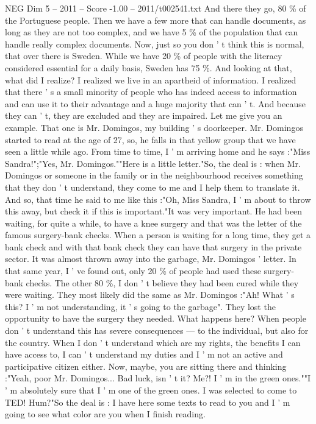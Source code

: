 \begin{textsample}{NEG Dim 5 – 2011 – Score -1.00 – 2011/t002541.txt}
And there they go, 80 \% of the Portuguese people.
Then we have a few more that can handle documents, as long as they are not too complex, and we have 5 \% of the population that can handle really complex documents.
Now, just so you don ' t think this is normal, that over there is Sweden.
While we have 20 \% of people with the literacy considered essential for a daily basis, Sweden has 75 \%.
And looking at that, what did I realize?
I realized we live in an apartheid of information.
I realized that there ' s a small minority of people who has indeed access to information and can use it to their advantage and a huge majority that can ' t.
And because they can ' t, they are excluded and they are impaired.
Let me give you an example.
That one is Mr.
Domingos, my building ' s doorkeeper.
Mr.
Domingos started to read at the age of 27, so, he falls in that yellow group that we have seen a little while ago.
From time to time, I ' m arriving home and he says :"Miss Sandra!";"Yes, Mr.
Domingos.""Here is a little letter."So, the deal is : when Mr.
Domingos or someone in the family or in the neighbourhood receives something that they don ' t understand, they come to me and I help them to translate it.
And so, that time he said to me like this :"Oh, Miss Sandra, I ' m about to throw this away, but check it if this is important."It was very important.
He had been waiting, for quite a while, to have a knee surgery and that was the letter of the famous surgery-bank checks.
When a person is waiting for a long time, they get a bank check and with that bank check they can have that surgery in the private sector.
It was almost thrown away into the garbage, Mr.
Domingos ' letter.
In that same year, I ' ve found out, only 20 \% of people had used these surgery-bank checks.
The other 80 \%, I don ' t believe they had been cured while they were waiting.
They most likely did the same as Mr.
Domingos :"Ah!
What ' s this?
I ' m not understanding, it ' s going to the garbage".
They lost the opportunity to have the surgery they needed.
What happens here?
When people don ' t understand this has severe consequences — to the individual, but also for the country.
When I don ' t understand which are my rights, the benefits I can have access to, I can ' t understand my duties and I ' m not an active and participative citizen either.
Now, maybe, you are sitting there and thinking :"Yeah, poor Mr.
Domingos...
Bad luck, isn ' t it?
Me?!
I ' m in the green ones.""I ' m absolutely sure that I ' m one of the green ones.
I was selected to come to TED!
Hum?"So the deal is : I have here some texts to read to you and I ' m going to see what color are you when I finish reading.

\end{textsample}
